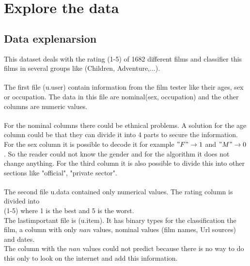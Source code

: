 \documentclass[11pt,a4paper]{article}
\begin{document}
\section{Explore the data}
\subsection{Data explenarsion}
This dataset deals with the rating (1-5) of 1682 different films and classifier this films in several groups like (Children, Adventure,...). \\\\The first file (u.user) contain information from the film tester like their ages, sex or occupation. The data in this file are nominal(sex, occupation) and the other columns are numeric values.\\\\ For the nominal columns there could be ethnical problems. A solution for the age column could be that they can divide it into 4 parts to secure the information. For the sex column it is possible to decode it for example $"F" \rightarrow 1$ and $"M" \rightarrow 0$. So the reader could not know the gender and for the algorithm it does not change anything. For the third column it is also possible to divide this into other sections like "official", "private sector".\\\\
The second file u.data contained only numerical values. The rating column is divided into \\(1-5) where 1 is the best and 5 is the worst.\\
The lastimportant file is (u.item). It has binary types for the classification the film, a column with only $nan$ values, nominal values (film names, Url sources) and dates.\\
The column with the $nan$ values could not predict because there is no way to do this only to look on the internet and add this information. 
\end{document}
